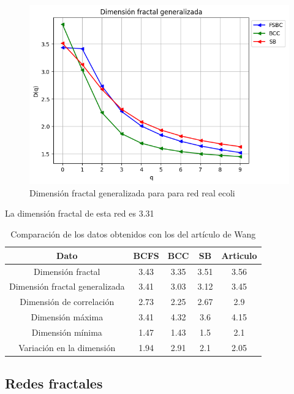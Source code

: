 \begin{figure}[H]
    \centering
    \includegraphics[scale=0.7]{Capitulo4Multifractalidad/imagenes/a_Dqecoli.png}
    \caption{Dimensión fractal generalizada para para red real ecoli}
\end{figure}

La dimensión fractal de esta red es 3.31

\begin{table}[H]
    \centering
    \begin{tabular}{|c|c|c|c|c|}
        \hline
         \textbf{Dato}& \textbf{BCFS} & \textbf{BCC} & \textbf{SB} & \textbf{Articulo} \\
         \hline
         Dimensión fractal & 3.43 & 3.35 & 3.51 & 3.56 \\
         \hline
         Dimensión fractal generalizada  & 3.41 & 3.03 & 3.12 & 3.45 \\
         \hline
         Dimensión de correlación & 2.73 & 2.25 & 2.67 & 2.9 \\
         \hline
         Dimensión máxima & 3.41 & 4.32 & 3.6 & 4.15 \\
         \hline
         Dimensión mínima & 1.47 & 1.43 & 1.5 & 2.1 \\
         \hline
         Variación en la dimensión & 1.94 & 2.91   & 2.1 & 2.05 \\
         \hline
    \end{tabular}
    \caption{Comparación de los datos obtenidos con los del artículo de Wang\cite{Wang2012}}
\end{table}


\subsection{Redes fractales}

